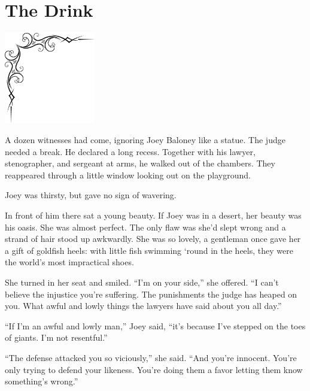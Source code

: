 \documentclass[oneside]{book}
\begin{document}
\chapter{The Drink}

\vspace{-2in}
\hspace{-.5in}
\includegraphics[width=150px]{ulcorner1.eps}

A dozen witnesses had come, ignoring Joey Baloney like a statue.
The judge needed a break.  He declared a long recess.  Together with his lawyer,
stenographer, and sergeant at arms, he walked out of the chambers.
They reappeared through a little window looking out
on the playground.

Joey was thirsty, but gave no sign of wavering.

In front of him there sat a young beauty.  If Joey was in a desert,
her beauty was his oasis.
She was almost perfect.  The only flaw was she'd slept wrong and a
strand of hair stood up awkwardly.
She was so lovely, a gentleman once gave her a gift of goldfish heels:
with little fish swimming `round in the heels, they were the world's
most impractical shoes.

She turned in her seat and smiled.  ``I'm on your side,''
she offered.  ``I can't believe the injustice you're suffering.  The punishments the
judge has heaped on you.  What awful and lowly things the lawyers have said about you all day.''

``If I'm an awful and lowly man,'' Joey said, ``it's because I've stepped on the toes of giants.
I'm not resentful.''

``The defense attacked you so viciously,'' she said.  ``And you're innocent.
You're only trying to defend your likeness.  You're doing them a favor letting them know
something's wrong.''
\end{document}
